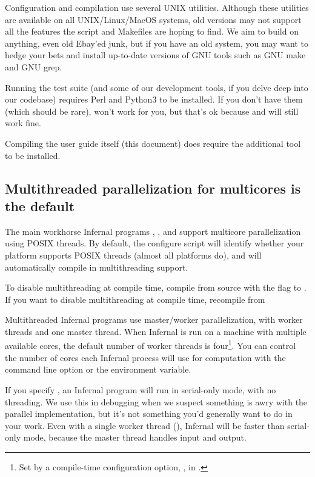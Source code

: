 Configuration and compilation use several UNIX utilities. Although
these utilities are available on all UNIX/Linux/MacOS systems, old
versions may not support all the features the 
script and Makefiles are hoping to find. We aim to build on anything,
even old Ebay'ed junk, but if you have an old system, you may want to
hedge your bets and install up-to-date versions of GNU tools such as
GNU make and GNU grep.

Running the test suite (and some of our development tools, if you
delve deep into our codebase) requires Perl and Python3 to be
installed.  If you don't have them (which should be rare),  won't work for you, but that's ok because  and
 will still work fine.

Compiling the user guide itself (this document) does require
the additional tool  to be installed.

\subsection{Multithreaded parallelization for multicores is the default}

The main workhorse Infernal programs ,
,  and  support
multicore parallelization using POSIX threads. By default, the
configure script will identify whether your platform supports POSIX
threads (almost all platforms do), and will automatically compile in
multithreading support.

To disable multithreading at compile time, compile from source with
the  flag to .
If you want to disable multithreading at compile time, recompile from

Multithreaded Infernal programs use master/worker parallelization, with
 worker threads and one master thread. When Infernal is run on
a machine with multiple available cores, the default number of worker
threads is four\footnote{Set by a compile-time configuration option,
  , in .}. You can control the
number of cores each Infernal process will use for computation with the
 command line option or the 
environment variable.

If you specify , an Infernal program will run in
serial-only mode, with no threading. We use this in debugging when we
suspect something is awry with the parallel implementation, but it's
not something you'd generally want to do in your work.  Even with a
single worker thread (), Infernal will be faster than
serial-only mode, because the master thread handles input and output.

